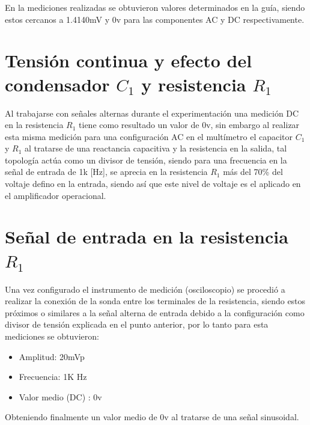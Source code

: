 \documentclass[conference]{IEEEtran}
\begin{document}
	En la mediciones realizadas se obtuvieron valores determinados en la guía, siendo estos cercanos a 1.4140mV y 0v para las componentes AC y DC respectivamente.
	
	\section{Tensión continua y efecto del condensador $C_1$ y resistencia $R_1$}
	
	Al trabajarse con señales alternas durante el experimentación una medición DC en la resistencia $R_1$ tiene como resultado un valor de 0v, sin embargo al realizar esta misma medición para una configuración AC en el multímetro el capacitor $C_1$ y $R_1$ al tratarse de una reactancia capacitiva y la resistencia en la salida, tal topología actúa como un divisor de tensión, siendo para una frecuencia en la señal de entrada de 1k [Hz], se aprecia en la resistencia $R_1$ más del 70\% del voltaje defino en la entrada, siendo así que este nivel de voltaje es el aplicado en el amplificador operacional.
	
	\section{Señal de entrada en la resistencia $R_1$}
	
	Una vez configurado el instrumento de medición (osciloscopio) se procedió a realizar la conexión de la sonda entre los terminales de la resistencia, siendo estos próximos o similares a la señal alterna de entrada debido a la configuración como divisor de tensión explicada en el punto anterior, por lo tanto para esta mediciones se obtuvieron:
	
	\begin{itemize}
		\item Amplitud: 20mVp
		\item Frecuencia: 1K Hz
		\item Valor medio (DC) : 0v
	\end{itemize}
	
	Obteniendo finalmente un valor medio de 0v al tratarse de una señal sinusoidal.
	
	
	
\end{document}

